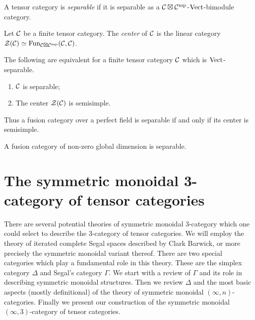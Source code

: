\documentclass{amsart}
\begin{document}
\begin{definition}
	A tensor category is {\em separable} if it is separable as a $\mathcal C \boxtimes \mathcal C^{\mathrm{mp}}$-$\mathrm{Vect}$-bimodule category.  
\end{definition}

\begin{definition}
	Let $\mathcal C$ be a finite tensor category. The {\em center} of $\mathcal C$ is the linear category $\mathcal Z(\mathcal C) \simeq \operatorname{Fun}_{\mathcal C \boxtimes \mathcal C^{\mathrm{mp}}}(\mathcal C, \mathcal C)$.
\end{definition}

\begin{corollary}
	The following are equivalent for a finite tensor category $\mathcal C$ which is $\mathrm{Vect}$-separable.
	\begin{enumerate}
		\item $\mathcal C$ is separable;
		\item The center $\mathcal Z(\mathcal C)$ is semisimple.
	\end{enumerate} 
\end{corollary}

Thus a fusion category over a perfect field is separable if and only if its center is semisimple. 

\begin{example}
	A fusion category of non-zero global dimension is separable. 
\end{example}



\section{The symmetric monoidal 3-category of tensor categories} \label{sec-sym-mon}



There are several potential theories of symmetric monoidal 3-category which one could select to describe the 3-category of tensor categories. We will employ the theory of iterated complete Segal spaces described by Clark Barwick,  or more precisely the symmetric monoidal variant thereof. There are two special categories which play a fundamental role in this theory. These are the simplex category $\Delta$ and Segal's category $\Gamma$. We start with a review of $\Gamma$ and its role in describing symmetric monoidal structures. Then we review $\Delta$ and the most basic aspects (mostly definitional) of the theory of symmetric monoidal $(\infty,n)$-categories. Finally we present our construction of the symmetric monoidal $(\infty,3)$-category of tensor categories. 
\end{document}
